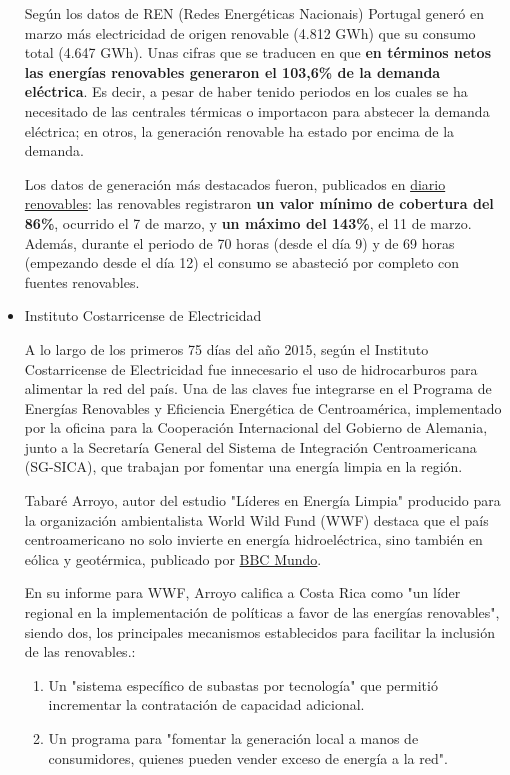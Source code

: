 \begin{itemize}
  Según los datos de REN (Redes Energéticas Nacionais) Portugal generó
  en marzo más electricidad de origen renovable (4.812 GWh) que su
  consumo total (4.647 GWh). Unas cifras que se traducen en que
  \textbf{en términos netos las energías renovables generaron el 103,6\%
  de la demanda eléctrica}. Es decir, a pesar de haber tenido periodos
  en los cuales se ha necesitado de las centrales térmicas o importacon
  para abstecer la demanda eléctrica; en otros, la generación renovable
  ha estado por encima de la demanda.

  Los datos de generación más destacados fueron, publicados en
  \href{https://www.diariorenovables.com/2018/04/portugal-genero-100-electricidad-energias-renovables.html}{diario
  renovables}: las renovables registraron \textbf{un valor mínimo de
  cobertura del 86\%}, ocurrido el 7 de marzo, y \textbf{un máximo del
  143\%}, el 11 de marzo. Además, durante el periodo de 70 horas (desde
  el día 9) y de 69 horas (empezando desde el día 12) el consumo se
  abasteció por completo con fuentes renovables. 
\item
  Instituto Costarricense de Electricidad

  A lo largo de los primeros 75 días del año 2015, según el Instituto
  Costarricense de Electricidad fue innecesario el uso de hidrocarburos
  para alimentar la red del país. Una de las claves fue integrarse en el
  Programa de Energías Renovables y Eficiencia Energética de
  Centroamérica, implementado por la oficina para la Cooperación
  Internacional del Gobierno de Alemania, junto a la Secretaría General
  del Sistema de Integración Centroamericana (SG-SICA), que trabajan por
  fomentar una energía limpia en la región.

  Tabaré Arroyo, autor del estudio "Líderes en Energía Limpia" producido
  para la organización ambientalista World Wild Fund (WWF) destaca que
  el país centroamericano no solo invierte en energía hidroeléctrica,
  sino también en eólica y geotérmica, publicado por
  \href{http://www.bbc.com/mundo/noticias/2015/03/150323_costa_rica_energia_renovable_az_ep}{BBC
  Mundo}.

  En su informe para WWF, Arroyo califica a Costa Rica como "un líder
  regional en la implementación de políticas a favor de las energías
  renovables", siendo dos, los principales mecanismos establecidos para
  facilitar la inclusión de las renovables.:

  \begin{enumerate}
  \def\labelenumi{\arabic{enumi}.}
  \item
    Un "sistema específico de subastas por tecnología" que permitió
    incrementar la contratación de capacidad adicional.
  \item
    Un programa para "fomentar la generación local a manos de
    consumidores, quienes pueden vender exceso de energía a la red".
  \end{enumerate}


\end{itemize}
